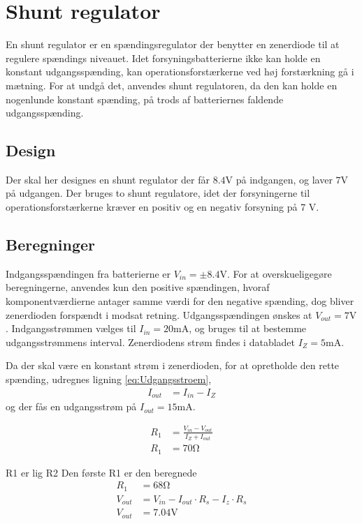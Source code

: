 \section{Shunt regulator}\label{sec:shunt}
En shunt regulator er en spændingsregulator der benytter en zenerdiode til at regulere spændings niveauet.
Idet forsyningsbatterierne ikke kan holde en konstant udgangsspænding, kan operationsforstærkerne ved høj forstærkning gå i mætning. 
For at undgå det, anvendes shunt regulatoren, da den kan holde en nogenlunde konstant spænding, på trods af batteriernes faldende udgangsspænding.

\subsection{Design}
Der skal her designes en shunt regulator der får $8.4 \si{\volt}$ på indgangen, og laver $7\si{\volt}$ på udgangen.
Der bruges to shunt regulatore, idet der forsyningerne til operationsforstærkerne kræver en positiv og en negativ forsyning på 7 \si{\volt}.

\subsection{Beregninger}
Indgangsspændingen fra batterierne er $V_{in} = \pm 8.4 \si{\volt}$. 
For at overskueligegøre beregningerne, anvendes kun den positive spændingen, hvoraf komponentværdierne antager samme værdi for den negative spænding, dog bliver zenerdioden forspændt i modsat retning.
Udgangsspændingen ønskes at $V_{out} = 7 \si{\volt}$. 
Indgangsstrømmen vælges til $I_{in} = 20\si{\milli\ampere}$, og bruges til at bestemme udgangsstrømmens interval.
Zenerdiodens strøm findes i databladet $I_Z = 5 \si{\milli\ampere}$.

Da der skal være en konstant strøm i zenerdioden, for at opretholde den rette spænding, udregnes ligning \ref{eq:Udgangsstroem},
\begin{align}
	I_{out} & = I_{in} - I_Z \label{eq:Udgangsstroem}
\end{align}
og der fås en udgangsstrøm på $I_{out} = 15 \si{\milli\ampere}$.

\begin{align}
	R_1 & = \frac{V_{in} - V_{out}}{I_Z + I_{out}} \label{eq:RegulatorModstand} \\
	R_1 & = 70 \si{\ohm} \nonumber \label{eq:RegulatorModstandBeregnet}
\end{align}

R1 er lig R2
Den første R1 er den beregnede
\begin{align}
	R_1 & = 68 \si{\ohm} \nonumber \\
	V_{out} & = V_{in} - I_{out} \cdot R_s - I_z \cdot R_s \\
	V_{out} & = 7.04 \si{\volt} \label{eq:RegulatorBeregnetPotentiale} 
\end{align}